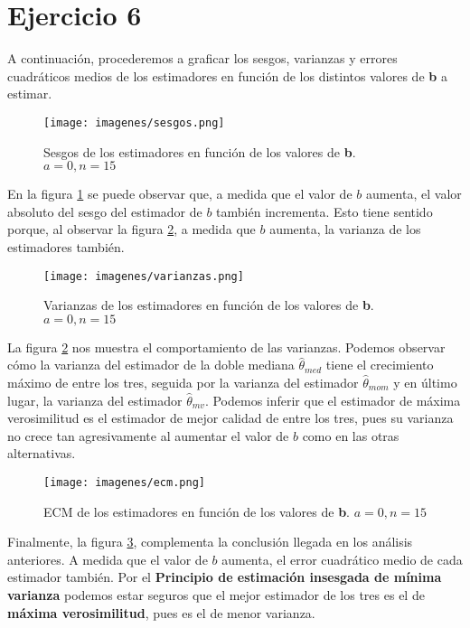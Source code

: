 \section{Ejercicio 6}
A continuación, procederemos a graficar los sesgos, varianzas y errores cuadráticos medios de los estimadores en función de los distintos valores de \textbf{b} a estimar.

\begin{figure}[H]
	\centering
	\texttt{[image: imagenes/sesgos.png]}
	\caption{\footnotesize Sesgos de los estimadores en función de los valores de \textbf{b}. $a=0, n=15$}
	\label{fig:ej6-sesgos}
\end{figure}

En la figura \ref{fig:ej6-sesgos} se puede observar que, a medida que el valor de $b$ aumenta, el valor absoluto del sesgo del estimador de $b$ también incrementa. Esto tiene sentido porque, al observar la figura \ref{fig:ej6-varianzas}, a medida que $b$ aumenta, la varianza de los estimadores también.

\begin{figure}[H]
	\centering
	\texttt{[image: imagenes/varianzas.png]}
	\caption{\footnotesize Varianzas de los estimadores en función de los valores de \textbf{b}. $a=0, n=15$}
	\label{fig:ej6-varianzas}
\end{figure}

La figura \ref{fig:ej6-varianzas} nos muestra el comportamiento de las varianzas. Podemos observar cómo la varianza del estimador de la doble mediana $\hat{\theta}_{med}$ tiene el crecimiento máximo de entre los tres, seguida por la varianza del estimador $\hat{\theta}_{mom}$ y en último lugar, la varianza del estimador $\hat{\theta}_{mv}$. Podemos inferir que el estimador de máxima verosimilitud es el estimador de mejor calidad de entre los tres, pues su varianza no crece tan agresivamente al aumentar el valor de $b$ como en las otras alternativas.

\begin{figure}[H]
	\centering
	\texttt{[image: imagenes/ecm.png]}
	\caption{\footnotesize ECM de los estimadores en función de los valores de \textbf{b}. $a=0, n=15$}
	\label{fig:ej6-ecm}
\end{figure}

Finalmente, la figura \ref{fig:ej6-ecm}, complementa la conclusión llegada en los análisis anteriores. A medida que el valor de $b$ aumenta, el error cuadrático medio de cada estimador también. Por el \textbf{Principio de estimación insesgada de mínima varianza} podemos estar seguros que el mejor estimador de los tres es el de \textbf{máxima verosimilitud}, pues es el de menor varianza.